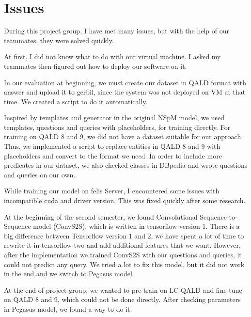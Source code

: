 
\section{Issues}

During this project group,
I have met many issues, 
but with the help of our teammates, 
they were solved quickly.

At first, I did not know what to do with our virtual machine. 
I asked my teammates then figured out how to deploy our software on it. 

In our evaluation at beginning, 
we must create our dataset in QALD format with answer
and upload it to gerbil,
since the system was not deployed on VM at that time. 
We created a script to do it automatically. 

Inspired by templates and generator in the original NSpM model,
we used templates, questions and queries with placeholders, for training directly.
For training on QALD 8 and 9, 
we did not have a dataset suitable for our approach. 
Thus, we implemented a script to replace entities in QALD 8 and 9 with placeholders
and convert to the format we need. 
In order to include more predicates in our dataset, 
we also checked classes in DBpedia 
and wrote questions and queries on our own. 

While training our model on felis Server, 
I encountered some issues with incompatible cuda and driver version. 
This was fixed quickly after some research. 

At the beginning of the second semester,
we found Convolutional Sequence-to-Sequence model (ConvS2S),
which is written in tensorflow version 1. 
There is a big difference between Tensorflow version 1 and 2,
we have spent a lot of time to rewrite it in tensorflow two
and add additional features that we want.
However, after the implementation we trained ConvS2S with our questions and queries,
it could not predict any query. 
We tried a lot to fix this model, 
but it did not work in the end
and we switch to Pegasus model. 

At the end of project group, 
we wanted to pre-train on LC-QALD and fine-tune on QALD 8 and 9,
which could not be done directly. 
After checking parameters in Pegasus model, 
we found a way to do it. 